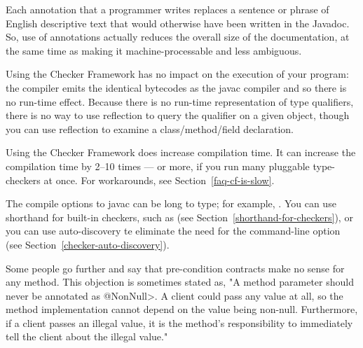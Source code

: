 Each annotation that a programmer writes replaces a sentence or phrase of
English descriptive text that would otherwise have been written in the
Javadoc.  So, use of annotations actually reduces the overall size of the
documentation, at the same time as making it machine-processable
and less ambiguous.



Using the Checker Framework has no impact on the execution of your program:
the compiler emits the identical bytecodes as the javac
compiler and so there is no run-time effect.  Because there is no run-time
representation of type qualifiers, there is no way to use reflection to
query the qualifier on a given object, though you can use reflection to
examine a class/method/field declaration.

Using the Checker Framework does increase compilation time.
It can increase the compilation time by 2--10 times --- or more, if you run
many pluggable type-checkers at once.  For workarounds, see
Section~\ref{faq-cf-is-slow}.



\begin{sloppypar}
The compile options to javac can be long to type; for example,
.
You can use shorthand for built-in checkers, such as  (see Section~\ref{shorthand-for-checkers}), or you can use
auto-discovery te eliminate the need for the  command-line
option (see Section~\ref{checker-auto-discovery}).
\end{sloppypar}



Some people go further and say that pre-condition contracts make no sense
for any method.  This objection is sometimes stated as, "A method parameter
should never be annotated as \<@NonNull>.  A client could pass any value at
all, so the method implementation cannot depend on the value being
non-null.  Furthermore, if a client passes an illegal value, it is the
method's responsibility to immediately tell the client about the illegal
value."

